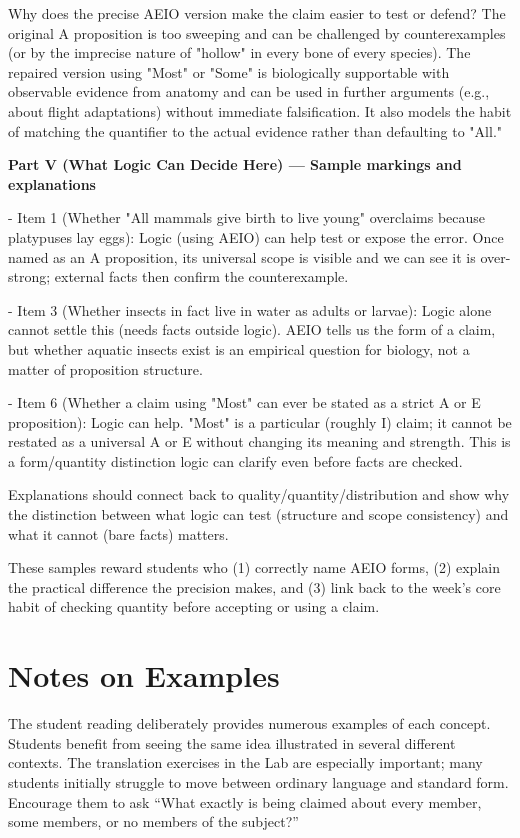 \documentclass[12pt]{article}
\begin{document}
Why does the precise AEIO version make the claim easier to test or defend? The original A proposition is too sweeping and can be challenged by counterexamples (or by the imprecise nature of "hollow" in every bone of every species). The repaired version using "Most" or "Some" is biologically supportable with observable evidence from anatomy and can be used in further arguments (e.g., about flight adaptations) without immediate falsification. It also models the habit of matching the quantifier to the actual evidence rather than defaulting to "All."

\textbf{Part V (What Logic Can Decide Here) — Sample markings and explanations}

- Item 1 (Whether "All mammals give birth to live young" overclaims because platypuses lay eggs): Logic (using AEIO) can help test or expose the error. Once named as an A proposition, its universal scope is visible and we can see it is over-strong; external facts then confirm the counterexample.

- Item 3 (Whether insects in fact live in water as adults or larvae): Logic alone cannot settle this (needs facts outside logic). AEIO tells us the form of a claim, but whether aquatic insects exist is an empirical question for biology, not a matter of proposition structure.

- Item 6 (Whether a claim using "Most" can ever be stated as a strict A or E proposition): Logic can help. "Most" is a particular (roughly I) claim; it cannot be restated as a universal A or E without changing its meaning and strength. This is a form/quantity distinction logic can clarify even before facts are checked.

Explanations should connect back to quality/quantity/distribution and show why the distinction between what logic can test (structure and scope consistency) and what it cannot (bare facts) matters.

These samples reward students who (1) correctly name AEIO forms, (2) explain the practical difference the precision makes, and (3) link back to the week's core habit of checking quantity before accepting or using a claim.

\section*{Notes on Examples}
The student reading deliberately provides numerous examples of each concept. Students benefit from seeing the same idea illustrated in several different contexts. The translation exercises in the Lab are especially important; many students initially struggle to move between ordinary language and standard form. Encourage them to ask “What exactly is being claimed about every member, some members, or no members of the subject?”
\end{document}
